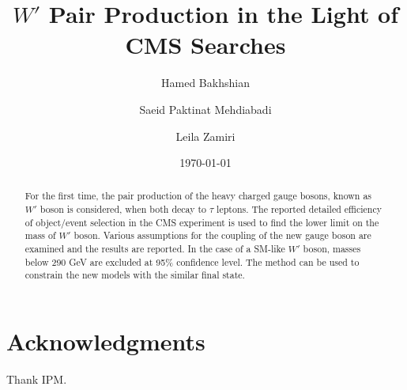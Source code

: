 \documentclass[preprint,showpacs,preprintnumbers]{revtex4}
\begin{document}
\linenumbers

\title{$W'$ Pair Production in the Light of CMS Searches}



\author{Hamed Bakhshian}

\author{Saeid Paktinat Mehdiabadi}

\author{Leila Zamiri}





\date{\today}

\begin{abstract}
For the first time, the pair production of the heavy charged gauge bosons, known as $W'$ boson is considered, when both decay to $\tau$ leptons. The reported detailed efficiency of object/event selection in the CMS experiment is used to find the lower limit on the mass of $W'$ boson. Various assumptions for the coupling of the new gauge boson are examined and the results are reported. In the case of a SM-like $W'$ boson, masses below 290 GeV are excluded at 95\% confidence level. The method can be used to constrain the new models with the similar final state.
\end{abstract}


\pacs{}
\maketitle













\section{Acknowledgments}
Thank IPM.



\end{document}
